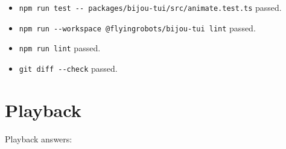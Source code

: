 \begin{itemize}
\tightlist
\item
  \texttt{n\allowbreak{}p\allowbreak{}m\allowbreak{} \allowbreak{}r\allowbreak{}u\allowbreak{}n\allowbreak{} \allowbreak{}t\allowbreak{}e\allowbreak{}s\allowbreak{}t\allowbreak{} \allowbreak{}-\allowbreak{}-\allowbreak{} \allowbreak{}p\allowbreak{}a\allowbreak{}c\allowbreak{}k\allowbreak{}a\allowbreak{}g\allowbreak{}e\allowbreak{}s\allowbreak{}/\allowbreak{}b\allowbreak{}i\allowbreak{}j\allowbreak{}o\allowbreak{}u\allowbreak{}-\allowbreak{}t\allowbreak{}u\allowbreak{}i\allowbreak{}/\allowbreak{}s\allowbreak{}r\allowbreak{}c\allowbreak{}/\allowbreak{}a\allowbreak{}n\allowbreak{}i\allowbreak{}m\allowbreak{}a\allowbreak{}t\allowbreak{}e\allowbreak{}.\allowbreak{}t\allowbreak{}e\allowbreak{}s\allowbreak{}t\allowbreak{}.\allowbreak{}t\allowbreak{}s} passed.
\item
  \texttt{n\allowbreak{}p\allowbreak{}m\allowbreak{} \allowbreak{}r\allowbreak{}u\allowbreak{}n\allowbreak{} \allowbreak{}-\allowbreak{}-\allowbreak{}w\allowbreak{}o\allowbreak{}r\allowbreak{}k\allowbreak{}s\allowbreak{}p\allowbreak{}a\allowbreak{}c\allowbreak{}e\allowbreak{} \allowbreak{}@\allowbreak{}f\allowbreak{}l\allowbreak{}y\allowbreak{}i\allowbreak{}n\allowbreak{}g\allowbreak{}r\allowbreak{}o\allowbreak{}b\allowbreak{}o\allowbreak{}t\allowbreak{}s\allowbreak{}/\allowbreak{}b\allowbreak{}i\allowbreak{}j\allowbreak{}o\allowbreak{}u\allowbreak{}-\allowbreak{}t\allowbreak{}u\allowbreak{}i\allowbreak{} \allowbreak{}l\allowbreak{}i\allowbreak{}n\allowbreak{}t} passed.
\item
  \texttt{n\allowbreak{}p\allowbreak{}m\allowbreak{} \allowbreak{}r\allowbreak{}u\allowbreak{}n\allowbreak{} \allowbreak{}l\allowbreak{}i\allowbreak{}n\allowbreak{}t} passed.
\item
  \texttt{g\allowbreak{}i\allowbreak{}t\allowbreak{} \allowbreak{}d\allowbreak{}i\allowbreak{}f\allowbreak{}f\allowbreak{} \allowbreak{}-\allowbreak{}-\allowbreak{}c\allowbreak{}h\allowbreak{}e\allowbreak{}c\allowbreak{}k} passed.
\end{itemize}

\section{Playback}\label{record-161-playback}

Playback answers:

